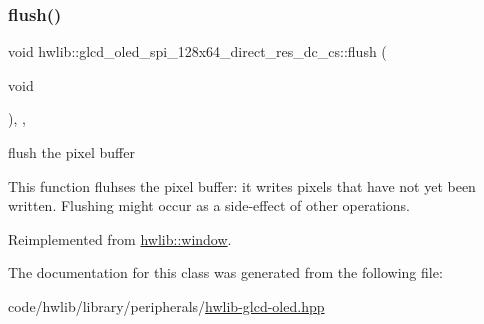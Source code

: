 \mbox{\label{classhwlib_1_1glcd__oled__spi__128x64__direct__res__dc__cs_ada856fccd0e72f8e95172e1aa901024c}} 
\subsubsection{\texorpdfstring{flush()}{flush()}}
{\footnotesize\ttfamily void hwlib\+::glcd\+\_\+oled\+\_\+spi\+\_\+128x64\+\_\+direct\+\_\+res\+\_\+dc\+\_\+cs\+::flush (\begin{DoxyParamCaption}\item[{void}]{ }\end{DoxyParamCaption})\hspace{0.3cm}{\ttfamily [inline]}, {\ttfamily [override]}, {\ttfamily [virtual]}}



flush the pixel buffer 

This function fluhses the pixel buffer\+: it writes pixels that have not yet been written. Flushing might occur as a side-\/effect of other operations. 

Reimplemented from \hyperlink{classhwlib_1_1window_a2b654a98872d174173e1df24a444c949}{hwlib\+::window}.



The documentation for this class was generated from the following file\+:\begin{DoxyCompactItemize}
\item 
code/hwlib/library/peripherals/\hyperlink{library_2peripherals_2hwlib-glcd-oled_8hpp}{hwlib-\/glcd-\/oled.\+hpp}\end{DoxyCompactItemize}
